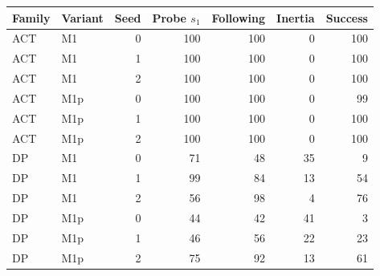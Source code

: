 \begin{tabular}{llrrrrr}
\toprule
Family & Variant & Seed & Probe $s_1$ & Following & Inertia & Success \\
\midrule
ACT & M1 & 0 & 100 & 100 & 0 & 100 \\
ACT & M1 & 1 & 100 & 100 & 0 & 100 \\
ACT & M1 & 2 & 100 & 100 & 0 & 100 \\
ACT & M1p & 0 & 100 & 100 & 0 & 99 \\
ACT & M1p & 1 & 100 & 100 & 0 & 100 \\
ACT & M1p & 2 & 100 & 100 & 0 & 100 \\
DP & M1 & 0 & 71 & 48 & 35 & 9 \\
DP & M1 & 1 & 99 & 84 & 13 & 54 \\
DP & M1 & 2 & 56 & 98 & 4 & 76 \\
DP & M1p & 0 & 44 & 42 & 41 & 3 \\
DP & M1p & 1 & 46 & 56 & 22 & 23 \\
DP & M1p & 2 & 75 & 92 & 13 & 61 \\
\bottomrule
\end{tabular}
